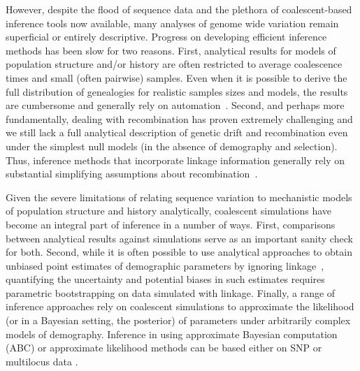 \documentclass[graybox]{svmult}
\begin{document}
However, despite the flood of sequence data and the plethora of
coalescent-based inference tools now available, many analyses of genome
wide variation remain superficial or entirely descriptive. Progress on
developing efficient inference methods has been slow for two reasons.
First, analytical results for models of population structure and/or history are
often restricted to average coalescence times and small (often pairwise)
samples. Even when it is possible to derive the full distribution of
genealogies for realistic samples sizes and models, the results are
cumbersome and generally rely on automation~\citep{Lohse2016}. Second, and
perhaps more fundamentally, dealing with recombination has proven
extremely challenging and we still lack a full analytical description of
genetic drift and recombination even under the simplest null models (in
the absence of demography and selection). Thus, inference methods that
incorporate linkage information generally rely on substantial simplifying
assumptions about recombination~\citep{mcvean2005approximating}.

Given the severe limitations of relating sequence variation to
mechanistic models of population structure and history analytically, coalescent simulations have become an
integral part of inference in a number of ways. First, comparisons
between analytical results against simulations serve as an important
sanity check for both. Second, while it is often possible to use
analytical approaches to obtain unbiased point estimates of demographic
parameters by ignoring linkage~\citep{gutenkunst2009inferring}, quantifying the uncertainty and potential biases in such estimates requires parametric bootstrapping on data simulated with linkage. Finally, a range
of inference approaches rely on coalescent simulations to
approximate the likelihood (or in a Bayesian setting, the posterior)
of parameters under arbitrarily complex models of demography. Inference in using approximate Bayesian computation (ABC) \citep{Beaumont2002, Cornuet2008} or approximate likelihood methods can be based either on SNP \citep{excoffier2013} or multilocus data \citep{becquet2007new, Beeravolu2017}.
\end{document}
